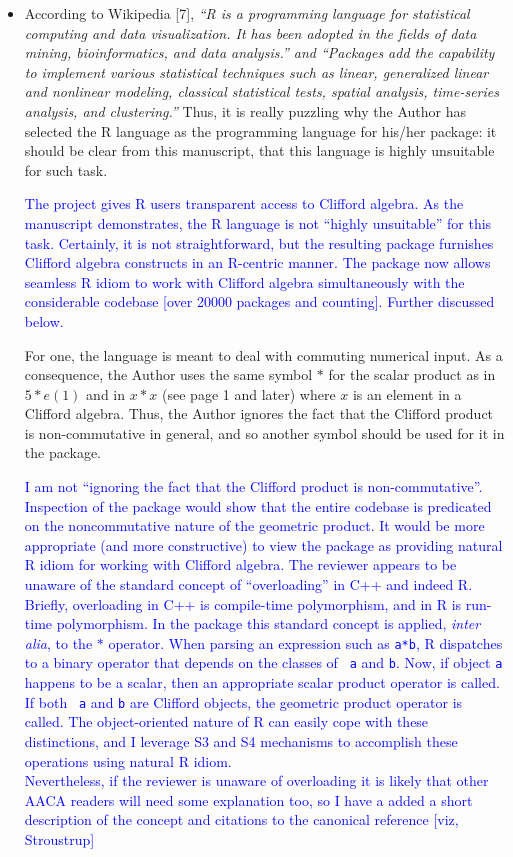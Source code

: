 \documentclass{article}
\begin{document}
\begin{itemize}
\item According to Wikipedia [7], {\em “R is a programming language for statistical computing and
data visualization. It has been adopted in the fields of data mining, bioinformatics, and data
analysis.” and “Packages add the capability to implement various statistical techniques such
as linear, generalized linear and nonlinear modeling, classical statistical tests, spatial analysis,
time-series analysis, and clustering.”}
Thus, it is really puzzling why the Author has selected the R language as the programming
language for his/her package: it should be clear from this manuscript, that this language is
highly unsuitable for such task.

\textcolor{blue}{The project gives R users transparent access to
  Clifford algebra.  As the manuscript demonstrates, the R language is
  not ``highly unsuitable'' for this task.  Certainly, it is not
  straightforward, but the resulting package furnishes Clifford
  algebra constructs in an R-centric manner.  The package now allows
  seamless R idiom to work with Clifford algebra simultaneously with
  the considerable codebase [over 20000 packages and counting].
  Further discussed below.}

For one, the language is meant to deal with commuting numerical
input. As a consequence, the Author uses the same symbol $*$ for the
scalar product as in $5* e(1)$ and in $x * x$ (see page 1 and later)
where $x$ is an element in a Clifford algebra.  Thus, the Author
ignores the fact that the Clifford product is non-commutative in
general, and so another symbol should be used for it in the package.

\textcolor{blue}{I am not ``ignoring the fact that the Clifford
  product is non-commutative''.  Inspection of the package
  would show that the entire codebase is predicated on the
  noncommutative nature of the geometric product.  It would be more
  appropriate (and more constructive) to view the package as providing
  natural R idiom for working with Clifford algebra.  The reviewer
  appears to be unaware of the standard concept of ``overloading'' in
  C++ and indeed R.  Briefly, overloading in C++ is compile-time
  polymorphism, and in R is run-time polymorphism.  In the package
  this standard concept is applied, {\em inter alia}, to the $*$
  operator.  When parsing an expression such as {\tt a*b}, R
  dispatches to a binary operator that depends on the classes of {\tt
    a} and {\tt b}.  Now, if object {\tt a} happens to be a scalar,
  then an appropriate scalar product operator is called.  If both {\tt
    a} and {\tt b} are Clifford objects, the geometric product
  operator is called.  The object-oriented nature of R can easily cope
  with these distinctions, and I leverage S3 and S4 mechanisms to
  accomplish these operations using natural R idiom.\\[20pt]
  Nevertheless, if the reviewer is unaware of overloading it is likely
  that other AACA readers will need some explanation too, so I have a
  added a short description of the concept and citations to the
  canonical reference [viz, Stroustrup]
}


\end{itemize}
\end{document}
